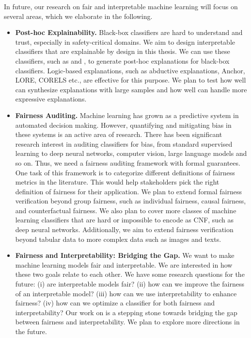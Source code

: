 In future, our research on fair and interpretable machine learning will focus on several areas, which we elaborate in the following.

\begin{itemize}
	\item 
	\textbf{Post-hoc Explainability.} Black-box classifiers are hard to understand and trust, especially in safety-critical domains. We aim to design interpretable classifiers that are explainable by design in this thesis. We can use these classifiers, such as {\imli} and {\crr}, to generate post-hoc explanations for black-box classifiers. Logic-based explanations, such as abductive explanations, Anchor, LORE, CORELS etc., are effective for this purpose. We plan to test how well {\imli} can synthesize explanations with large samples and how well {\crr} can handle more expressive explanations.
	
	
	\item \textbf{Fairness Auditing.} Machine learning has grown as a predictive system in automated decision making. However, quantifying and mitigating bias in these systems is an active area of research. There has been significant research interest in auditing classifiers for bias, from standard supervised learning to deep neural networks, computer vision, large language models and so on. Thus, we need a fairness auditing framework with formal guarantees. One task of this framework is to categorize different definitions of fairness metrics in the literature. This would help stakeholders pick the right definition of fairness for their application. We plan to extend formal fairness verification beyond group fairness, such as individual fairness, causal fairness, and counterfactual fairness. We also plan to cover more classes of machine learning classifiers that are hard or impossible to encode as CNF, such as deep neural networks. Additionally, we aim to extend fairness verification beyond tabular data to more complex data such as images and texts.
	
	
	\item \textbf{Fairness and Interpretability: Bridging the Gap.} We want to make machine learning models fair and interpretable. We are interested in how these two goals relate to each other. We have some research questions for the future: (i) are interpretable models fair? (ii) how can we improve the fairness of an interpretable model? (iii) how can we use interpretability to enhance fairness? (iv) how can we optimize a classifier for both fairness and interpretability? Our work on {\fairXplainer} is a stepping stone towards bridging the gap between fairness and interpretability. We plan to explore more directions in the future.
	

\end{itemize}
